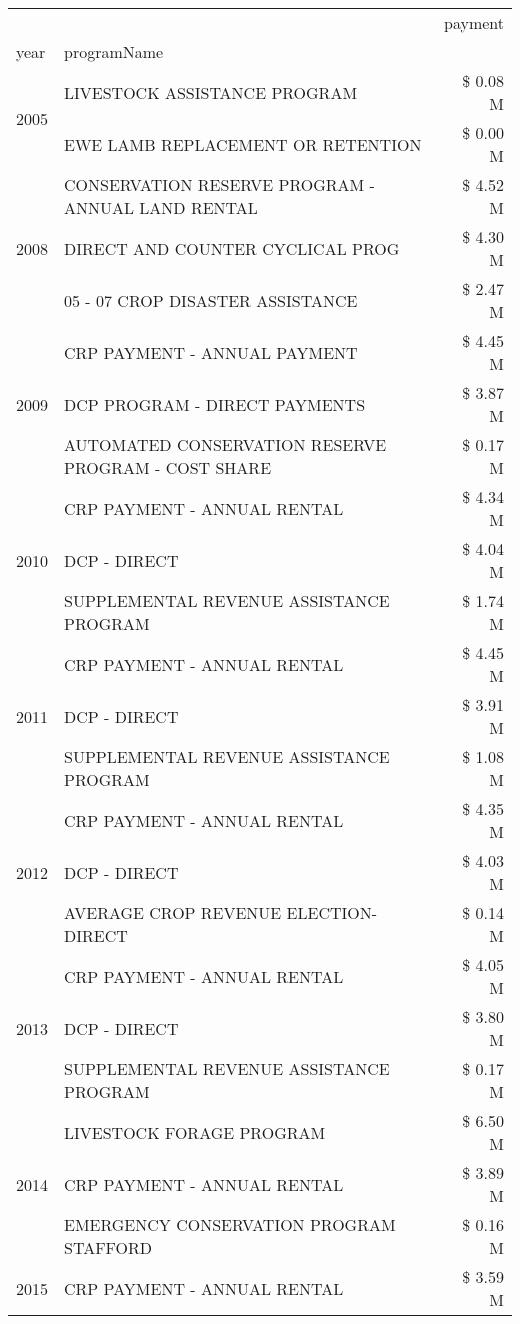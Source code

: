 \begin{tabular}{llr}
\toprule
 &  & payment \\
year & programName &  \\
\midrule
\multirow[t]{2}{*}{2005} & LIVESTOCK ASSISTANCE PROGRAM & \$ 0.08 M \\
 & EWE LAMB REPLACEMENT OR RETENTION & \$ 0.00 M \\
\cline{1-3}
\multirow[t]{3}{*}{2008} & CONSERVATION RESERVE PROGRAM - ANNUAL LAND RENTAL & \$ 4.52 M \\
 & DIRECT AND COUNTER CYCLICAL PROG & \$ 4.30 M \\
 & 05 - 07 CROP DISASTER ASSISTANCE & \$ 2.47 M \\
\cline{1-3}
\multirow[t]{3}{*}{2009} & CRP PAYMENT - ANNUAL PAYMENT & \$ 4.45 M \\
 & DCP PROGRAM - DIRECT PAYMENTS & \$ 3.87 M \\
 & AUTOMATED CONSERVATION RESERVE PROGRAM - COST SHARE & \$ 0.17 M \\
\cline{1-3}
\multirow[t]{3}{*}{2010} & CRP PAYMENT - ANNUAL RENTAL & \$ 4.34 M \\
 & DCP - DIRECT & \$ 4.04 M \\
 & SUPPLEMENTAL REVENUE ASSISTANCE PROGRAM & \$ 1.74 M \\
\cline{1-3}
\multirow[t]{3}{*}{2011} & CRP PAYMENT - ANNUAL RENTAL & \$ 4.45 M \\
 & DCP - DIRECT & \$ 3.91 M \\
 & SUPPLEMENTAL REVENUE ASSISTANCE PROGRAM & \$ 1.08 M \\
\cline{1-3}
\multirow[t]{3}{*}{2012} & CRP PAYMENT - ANNUAL RENTAL & \$ 4.35 M \\
 & DCP - DIRECT & \$ 4.03 M \\
 & AVERAGE CROP REVENUE ELECTION-DIRECT & \$ 0.14 M \\
\cline{1-3}
\multirow[t]{3}{*}{2013} & CRP PAYMENT - ANNUAL RENTAL & \$ 4.05 M \\
 & DCP - DIRECT & \$ 3.80 M \\
 & SUPPLEMENTAL REVENUE ASSISTANCE PROGRAM & \$ 0.17 M \\
\cline{1-3}
\multirow[t]{3}{*}{2014} & LIVESTOCK FORAGE PROGRAM & \$ 6.50 M \\
 & CRP PAYMENT - ANNUAL RENTAL & \$ 3.89 M \\
 & EMERGENCY CONSERVATION PROGRAM STAFFORD & \$ 0.16 M \\
\cline{1-3}
\multirow[t]{3}{*}{2015} & CRP PAYMENT - ANNUAL RENTAL & \$ 3.59 M \\

\end{tabular}
